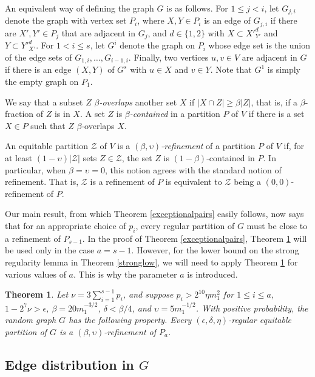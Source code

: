 \documentclass[11pt]{article}
\newtheorem{theorem}{Theorem}[section]
\begin{document}
An equivalent way of defining the graph $G$ is as follows. For $1 \leq j < i$,
let $G_{j,i}$ denote the graph with vertex set $P_i$, where $X,Y \in P_i$ is an
edge of $G_{j,i}$
if there are $X',Y' \in P_j$ that are adjacent in $G_j$, and $d \in \{1,2\}$
with $X \subset X'^d_{Y'}$ and $Y \subset Y'^d_{X'}$. For $1<i \leq s$, let
$G^i$ denote the graph on $P_{i}$ whose edge set is the union of the edge sets
of $G_{1,i},\ldots,G_{i-1,i}$. Finally, two vertices $u,v \in V$ are adjacent
in $G$ if there is an edge $(X,Y)$ of $G^s$ with
$u \in X$ and $v \in Y$. Note that $G^1$ is simply the empty graph on $P_1$. 

We say that a subset $Z$ {\it $\beta$-overlaps} another set $X$ if $|X \cap Z|
\geq \beta|Z|$, that is, if a $\beta$-fraction of $Z$ is in $X$. A set $Z$
is {\it $\beta$-contained} in a partition $P$ of $V$ if there is a set $X \in
P$ such that $Z$ $\beta$-overlaps $X$.

An equitable partition $\mathcal{Z}$ of $V$ is a {\it
$(\beta,\upsilon)$-refinement} of a partition $P$ of $V$ if, for at least
$(1-\upsilon)|\mathcal{Z}|$ sets $Z \in \mathcal{Z}$, the set $Z$ is
$(1-\beta)$-contained in $P$. In particular, when $\beta=\upsilon=0$, this
notion agrees with the standard notion of refinement. That is, $\mathcal{Z}$ is
a refinement of $P$ is equivalent to $\mathcal{Z}$ being a $(0,0)$-refinement
of $P$.

Our main result, from which Theorem \ref{exceptionalpairs} easily follows, now says that for an appropriate choice of $p_i$, every regular partition of $G$ must be close to a refinement of $P_{s-1}$. In the proof of Theorem \ref{exceptionalpairs}, Theorem \ref{maingen} will be used only in the case $a = s-1$. However, for the lower bound on the strong regularity lemma in Theorem \ref{stronglow}, we will need to apply Theorem \ref{maingen} for various values of $a$. This is why the parameter $a$ is introduced.

\begin{theorem}\label{maingen} Let $\nu=3\sum_{i=1}^{s-1}p_i$, and suppose
$p_i>2^{10}\eta m_1^2$ for $1 \leq i \leq a$, $1-2^7\nu>\epsilon$,
 $\beta=20m_1^{-3/2}$, $\delta<\beta/4$, and $\upsilon=5m_1^{-1/2}$. With
positive probability, the random graph $G$ has the following property. Every
$(\epsilon,\delta,\eta)$-regular equitable partition of $G$ is a
$(\beta,\upsilon)$-refinement of $P_a$.
\end{theorem}

\subsection{Edge distribution in $G$}
\end{document}
